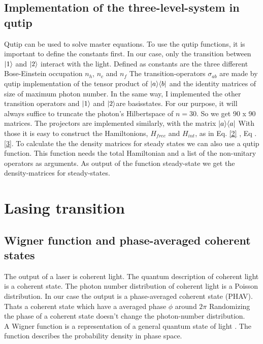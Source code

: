 \documentclass[12pt,a4paper]{article}
\DeclarePairedDelimiter\bra{\langle}{\rvert}
\DeclarePairedDelimiter\ket{\lvert}{\rangle}
\begin{document}
\subsection{Implementation of the three-level-system in qutip}
Qutip can be used to solve master equations. To use the qutip functions, it is important to define the constants first.  
In our case, only the transition between $\ket{1}$ and $\ket{2}$ interact with the light. 
Defined as constants are the three different Bose-Einstein occupation $n_h$, $n_c$ and $n_f$
The transition-operators $\sigma_{ab}$ are  made by qutip implementation of the tensor product of $\ket{a}\bra{b}$ and the identity matrices of size of maximum photon number. 
In the same way, I implemented the other transition operators and 
$\ket{1}$ and $\ket{2}$are basisstates. For our purpose, it will  always suffice to truncate the photon's Hilbertspace of $n=30$. So we get  90 x 90 matrices. 
The projectors are implemented similarly, with the matrix $\ket{a}\bra{a}$
With those it is easy to construct the Hamiltonions, $H_{free}$ and $H_{int}$, as in Eq. \eqref{2} , Eq .\eqref{3}.
To calculate the the density matrices for steady states we can also use a qutip function.
This function needs the total Hamiltonian and a list of the non-unitary operators as arguments.
As output of the function steady-state we get the density-matrices for steady-states. \cite{Nation2022}
\section{Lasing transition}

\subsection{Wigner function and phase-averaged coherent states}
The output of a laser is coherent light.
The quantum description of coherent light is a coherent state. The photon number distribution of coherent light is a Poisson distribution.
In our case the output is a phase-averaged coherent state (PHAV). 
Thats a coherent state which have a averaged phase $\phi$ around $2\pi$
 Randomizing the phase of a coherent state doesn't change the photon-number distribution. \\

A Wigner function is a representation of a general quantum state of light \cite{Allevi2013}.
The function describes the probability density in phase space.
\end{document}

